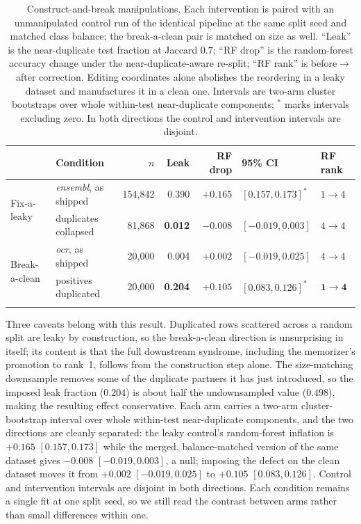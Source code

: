 \documentclass[webpdf,modern,large,namedate]{oup-authoring-template}%
\begin{document}
\begin{table}[tbp]
\begin{center}
\caption{Construct-and-break manipulations. Each intervention is paired with an unmanipulated control run of the identical pipeline at the same split seed and matched class balance; the break-a-clean pair is matched on size as well. ``Leak'' is the near-duplicate test fraction at Jaccard $0.7$; ``RF drop'' is the random-forest accuracy change under the near-duplicate-aware re-split; ``RF rank'' is before$\to$after correction. Editing coordinates alone abolishes the reordering in a leaky dataset and manufactures it in a clean one. Intervals are two-arm cluster bootstraps over whole within-test near-duplicate components; $^{*}$ marks intervals excluding zero. In both directions the control and intervention intervals are disjoint.\label{tab:manip}}
\footnotesize\setlength{\tabcolsep}{3pt}\begin{tabular}{@{}llrrrll@{}}
\toprule
& Condition & $n$ & Leak & RF drop & 95\% CI & RF rank\\
\midrule
\multirow{2}{*}{Fix-a-leaky} & \textit{ensembl}, as shipped & 154{,}842 & 0.390 & $+0.165$ & $[0.157,0.173]^{*}$ & $1\!\to\!4$\\
& \quad duplicates collapsed & 81{,}868 & \textbf{0.012} & $\mathbf{-0.008}$ & $[-0.019,0.003]$ & $4\!\to\!4$\\
\midrule
\multirow{2}{*}{Break-a-clean} & \textit{ocr}, as shipped & 20{,}000 & 0.004 & $+0.002$ & $[-0.019,0.025]$ & $4\!\to\!4$\\
& \quad positives duplicated & 20{,}000 & \textbf{0.204} & $\mathbf{+0.105}$ & $[0.083,0.126]^{*}$ & $\mathbf{1\!\to\!4}$\\
\botrule
\end{tabular}
\end{center}
\end{table}

Three caveats belong with this result. Duplicated rows scattered across a random split are leaky by construction, so the break-a-clean direction is unsurprising in itself; its content is that the full downstream syndrome, including the memorizer's promotion to rank~1, follows from the construction step alone. The size-matching downsample removes some of the duplicate partners it has just introduced, so the imposed leak fraction ($0.204$) is about half the undownsampled value ($0.498$), making the resulting effect conservative. Each arm carries a two-arm cluster-bootstrap interval over whole within-test near-duplicate components, and the two directions are cleanly separated: the leaky control's random-forest inflation is $+0.165$ $[0.157,0.173]$ while the merged, balance-matched version of the same dataset gives $-0.008$ $[-0.019,0.003]$, a null; imposing the defect on the clean dataset moves it from $+0.002$ $[-0.019,0.025]$ to $+0.105$ $[0.083,0.126]$. Control and intervention intervals are disjoint in both directions. Each condition remains a single fit at one split seed, so we still read the contrast between arms rather than small differences within one.
\end{document}
